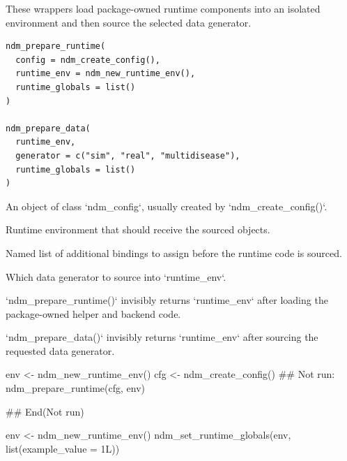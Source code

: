 \documentclass[a4paper]{book}
\begin{document}
%
\begin{Description}
These wrappers load package-owned runtime components into an isolated
environment and then source the selected data generator.
\end{Description}
%
\begin{Usage}
\begin{verbatim}
ndm_prepare_runtime(
  config = ndm_create_config(),
  runtime_env = ndm_new_runtime_env(),
  runtime_globals = list()
)

ndm_prepare_data(
  runtime_env,
  generator = c("sim", "real", "multidisease"),
  runtime_globals = list()
)
\end{verbatim}
\end{Usage}
%
\begin{Arguments}
\begin{ldescription}
\item[\code{config}] An object of class `ndm\_config`, usually created by
`ndm\_create\_config()`.

\item[\code{runtime\_env}] Runtime environment that should receive the sourced
objects.

\item[\code{runtime\_globals}] Named list of additional bindings to assign before the
runtime code is sourced.

\item[\code{generator}] Which data generator to source into `runtime\_env`.
\end{ldescription}
\end{Arguments}
%
\begin{Value}
`ndm\_prepare\_runtime()` invisibly returns `runtime\_env` after
loading the package-owned helper and backend code.

`ndm\_prepare\_data()` invisibly returns `runtime\_env` after sourcing
the requested data generator.
\end{Value}
%
\begin{Examples}
\begin{ExampleCode}
env <- ndm_new_runtime_env()
cfg <- ndm_create_config()
## Not run: 
ndm_prepare_runtime(cfg, env)

## End(Not run)

env <- ndm_new_runtime_env()
ndm_set_runtime_globals(env, list(example_value = 1L))

\end{ExampleCode}
\end{Examples}
\end{document}
